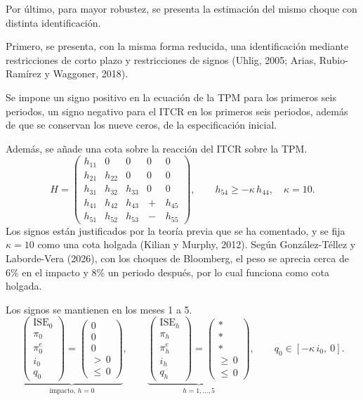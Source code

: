 \documentclass[12pt,letterpaper]{article}
\begin{document}
Por último, para mayor robustez, se presenta la estimación del mismo choque con distinta identificación.

Primero, se presenta, con la misma forma reducida, una identificación mediante restricciones de corto plazo y restricciones de signos (Uhlig, 2005; Arias, Rubio-Ramírez y Waggoner, 2018).

Se impone un signo positivo en la ecuación de la TPM para los primeros seis periodos, un signo negativo para el ITCR en los primeros seis periodos, además de que se conservan los nueve ceros, de la especificación inicial.

Además, se añade una cota sobre la reacción del ITCR sobre la TPM.
\begin{equation}\label{eq:D_H}
H = \begin{pmatrix}
h_{11} & 0 & 0 & 0 & 0\\
h_{21} & h_{22} & 0 & 0 & 0\\
h_{31} & h_{32} & h_{33} & 0 & 0\\
h_{41} & h_{42} & h_{43} & \boxed{\,{+}\,} & h_{45}\\
h_{51} & h_{52} & h_{53} & \boxed{\,{-}\,} & h_{55}
\end{pmatrix},
\qquad h_{54} \ge -\kappa\, h_{44}, \quad \kappa = 10.
\end{equation}
Los signos están justificados por la teoría previa que se ha comentado, y se fija $\kappa = 10$ como una cota holgada (Kilian y Murphy, 2012). Según González-Téllez y Laborde-Vera (2026), con los choques de Bloomberg, el peso se aprecia cerca de 6\% en el impacto y 8\% un periodo después, por lo cual funciona como cota holgada.

Los signos se mantienen en los meses 1 a 5.
\begin{equation}\label{eq:D_signos}
\underbrace{\begin{pmatrix} \mathrm{ISE}_0\\ \pi_0\\ \pi^e_0\\ i_0\\ q_0 \end{pmatrix} =
\begin{pmatrix} 0\\ 0\\ 0\\ {>}\,0\\ {\le}\,0 \end{pmatrix}}_{\text{impacto, } h=0},
\qquad
\underbrace{\begin{pmatrix} \mathrm{ISE}_h\\ \pi_h\\ \pi^e_h\\ i_h\\ q_h \end{pmatrix} =
\begin{pmatrix} *\\ *\\ *\\ {\ge}\,0\\ {\le}\,0 \end{pmatrix}}_{h = 1,\dots,5},
\qquad q_0 \in [-\kappa\, i_0,\ 0].
\end{equation}
\end{document}
